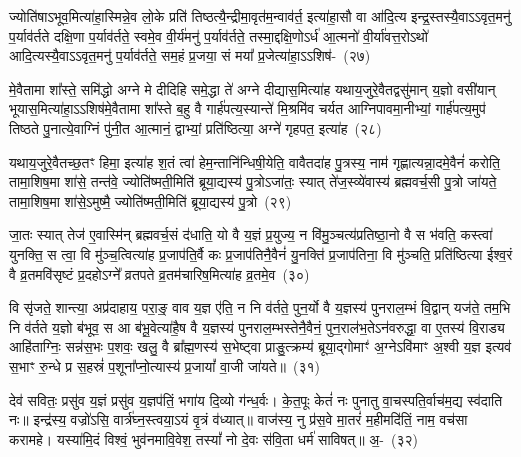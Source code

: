 ज्योति॑षा\-ऽभूव॒मित्या॑हा॒स्मिन्ने॒व लो॒के प्रति॑ तिष्ठत्यै॒न्द्रीमा॒\-वृत॑म॒न्वाव॑र्त॒ इत्या॑हा॒सौ वा आ॑दि॒त्य इन्द्र॒स्तस्यै॒वा\-ऽऽ\-\-वृत॒मनु॑ प॒र्याव॑र्तते दक्षि॒णा प॒र्याव॑र्तते॒ स्वमे॒व वी॒र्य॑मनु॑ प॒र्याव॑र्तते॒ तस्मा॒द्दक्षि॒णो\-ऽर्ध॑ आ॒त्मनो॑ वी॒र्या॑वत्त॒रो\-ऽथो॑ आदि॒त्यस्यै॒वा\-ऽऽ\-वृत॒मनु॑ प॒र्याव॑र्तते॒ सम॒हं प्र॒जया॒ सं मया᳚ प्र॒जेत्या॑हा॒\-ऽऽ\-शिष॑-~(२७)\ip

मे॒वैतामा शा᳚स्ते॒ समि॑द्धो अग्ने मे दीदिहि समे॒द्धा ते॑ अग्ने दीद्यास॒मित्या॑ह यथाय॒जुरे॒वैतद्वसु॑मान् य॒ज्ञो वसी॑यान् भूयास॒मित्या॑हा॒\-ऽऽ\-शिष॑मे॒वैतामा शा᳚स्ते ब॒हु वै गार्\mbox{}ह॑पत्य॒स्यान्ते॑ मि॒श्रमि॑व चर्यत आग्निपावमा॒नीभ्यां॒ गार्\mbox{}ह॑पत्य॒मुप॑ तिष्ठते पु॒नात्ये॒वाग्निं पु॑नी॒त आ॒त्मानं॒ द्वाभ्यां॒ प्रति॑ष्ठित्या॒ अग्ने॑ गृहपत॒ इत्या॑ह~(२८)\ip

यथाय॒जुरे॒वैतच्छ॒तꣳ हिमा॒ इत्या॑ह श॒तं त्वा॑ हेम॒न्तानि॑न्धिषी॒येति॒ वावैतदा॑ह पु॒त्रस्य॒ नाम॑ गृह्णात्यन्ना॒दमे॒वैनं॑ करोति॒ तामा॒शिष॒मा शा॑से॒ तन्त॑वे॒ ज्योति॑ष्मती॒मिति॑ ब्रूया॒द्यस्य॑ पु॒त्रो\-ऽजा॑तः॒ स्यात् ते॑ज॒स्व्ये॑वास्य॑ ब्रह्मवर्च॒सी पु॒त्रो जा॑यते॒ तामा॒शिष॒मा शा॑से॒\-ऽमुष्मै॒ ज्योति॑ष्मती॒मिति॑ ब्रूया॒द्यस्य॑ पु॒त्रो~(२९)\ip

जा॒तः स्यात् तेज॑ ए॒वास्मि॑न् ब्रह्मवर्च॒सं द॑धाति॒ यो वै य॒ज्ञं प्र॒युज्य॒ न वि॑मु॒ञ्चत्य॑प्रतिष्ठा॒नो वै स भ॑वति॒ कस्त्वा॑ युनक्ति॒ स त्वा॒ वि मु॑ञ्च॒त्वित्या॑ह प्र॒जा\-प॑ति॒र्वै कः प्र॒जा\-प॑तिनै॒वैनं॑ यु॒नक्ति॑ प्र॒जा\-प॑तिना॒ वि मु॑ञ्चति॒ प्रति॑ष्ठित्या ईश्व॒रं वै व्र॒तमवि॑सृष्टं प्र॒दहो\-ऽग्ने᳚ व्रतपते व्र॒तम॑चारिष॒मित्या॑ह व्र॒तमे॒व~(३०)\ip

वि सृ॑जते॒ शान्त्या॒ अप्र॑दाहाय॒ परा॒ङ्॒ वाव य॒ज्ञ ए॑ति॒ न नि व॑र्तते॒ पुन॒र्यो वै य॒ज्ञस्य॑ पुनराल॒म्भं वि॒द्वान् यज॑ते॒ तम॒भि नि व॑र्तते य॒ज्ञो ब॑भूव॒ स आ ब॑भू॒वेत्या॑है॒ष वै य॒ज्ञस्य॑ पुनराल॒म्भस्तेनै॒वैनं॒ पुन॒राल॑भ॒ते\-ऽन॑वरुद्धा॒ वा ए॒तस्य॑ वि॒राड्य आहि॑ताग्निः॒ सन्न॑स॒भः प॒शवः॒ खलु॒ वै ब्रा᳚ह्म॒णस्य॑ स॒भेष्ट्वा प्राङु॒त्क्रम्य॑ ब्रूया॒द्गोमाꣳ॑ अ॒ग्ने\-ऽवि॑माꣳ अ॒श्वी य॒ज्ञ इत्यव॑ स॒भाꣳ रु॒न्धे प्र स॒हस्रं॑ प॒शूना᳚प्नो॒त्यास्य॑ प्र॒जायां᳚ वा॒जी जा॑यते॥~(३१)\ip

{}

देव॑ सवितः॒ प्रसु॑व य॒ज्ञं प्रसु॑व य॒ज्ञप॑तिं॒ भगा॑य दि॒व्यो ग॑न्ध॒र्वः। के॒त॒पूः केतं॑ नः पुनातु वा॒चस्पति॒र्वाच॑म॒द्य स्व॑दाति नः॥ इन्द्र॑स्य॒ वज्रो॑\-ऽसि॒ वार्त्र॑घ्न॒स्त्वया॒\-ऽयं वृ॒त्रं व॑ध्यात्॥ वाज॑स्य॒ नु प्र॑स॒वे मा॒तरं॑ म॒हीमदि॑तिं॒ नाम॒ वच॑सा करामहे। यस्या॑मि॒दं विश्वं॒ भुव॑नमावि॒वेश॒ तस्यां᳚ नो दे॒वः स॑वि॒ता धर्म॑ साविषत्॥ अ॒-~(३२)\ip

